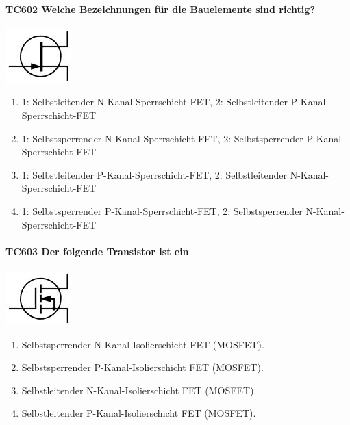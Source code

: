 \documentclass[8pt]{article}
\begin{document}
\begin{enumerate}
\begin{enumerate}[nolistsep,label=\Alph*]
{\begin{enumerate}[nolistsep,label=\Alph*]
\paragraph*{TC602 Welche Bezeichnungen für die Bauelemente sind richtig?}
\begin{center}
	\begin{minipage}{\linewidth}
		\centering
		\includegraphics[scale=1.0]{pics/tc602_a.jpg}
	\end{minipage}
\end{center}
\begin{enumerate}[nolistsep,label=\Alph*]
\item 1: Selbstleitender N-Kanal-Sperrschicht-FET, 2: Selbstleitender P-Kanal-Sperrschicht-FET
\item 1: Selbstsperrender N-Kanal-Sperrschicht-FET, 2: Selbstsperrender P-Kanal-Sperrschicht-FET
\item 1: Selbstleitender P-Kanal-Sperrschicht-FET, 2: Selbstleitender N-Kanal-Sperrschicht-FET
\item 1: Selbstsperrender P-Kanal-Sperrschicht-FET, 2: Selbstsperrender N-Kanal-Sperrschicht-FET
\end{enumerate}

\paragraph*{TC603 Der folgende Transistor ist ein}
\begin{center}
	\begin{minipage}{\linewidth}
		\centering
		\includegraphics[scale=1.0]{pics/tc603_a.jpg}
	\end{minipage}
\end{center}
\begin{enumerate}[nolistsep,label=\Alph*]
\item Selbstsperrender N-Kanal-Isolierschicht FET (MOSFET).
\item Selbstsperrender P-Kanal-Isolierschicht FET (MOSFET).
\item Selbstleitender N-Kanal-Isolierschicht FET (MOSFET).
\item Selbstleitender P-Kanal-Isolierschicht FET (MOSFET).
\end{enumerate}


\end{enumerate}}
\end{enumerate}
\end{enumerate}
\end{document}
